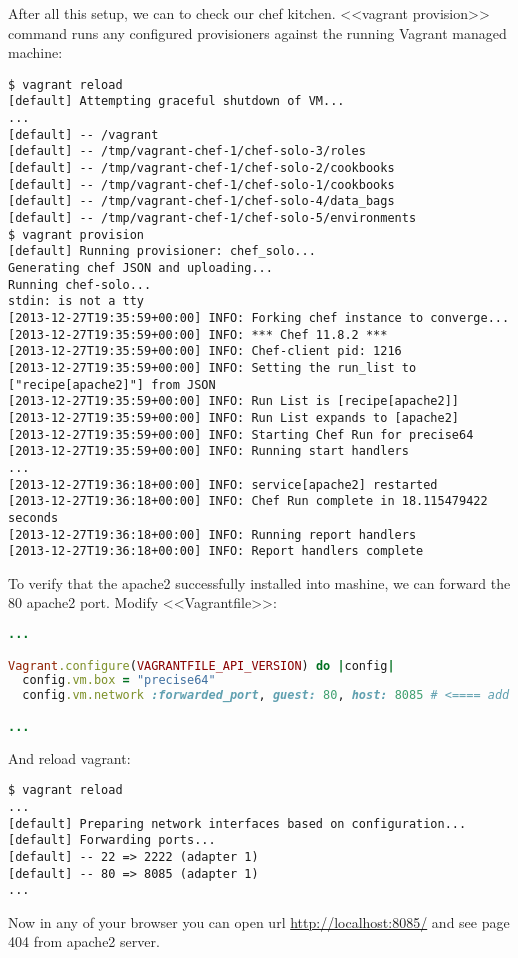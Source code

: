 After all this setup, we can to check our chef kitchen. <<vagrant provision>> command runs any configured provisioners against the running Vagrant managed machine:

\begin{lstlisting}[label=lst:my-cloud-vagrant8,title=my-cloud/nodes/Vagrantfile]
$ vagrant reload
[default] Attempting graceful shutdown of VM...
...
[default] -- /vagrant
[default] -- /tmp/vagrant-chef-1/chef-solo-3/roles
[default] -- /tmp/vagrant-chef-1/chef-solo-2/cookbooks
[default] -- /tmp/vagrant-chef-1/chef-solo-1/cookbooks
[default] -- /tmp/vagrant-chef-1/chef-solo-4/data_bags
[default] -- /tmp/vagrant-chef-1/chef-solo-5/environments
$ vagrant provision
[default] Running provisioner: chef_solo...
Generating chef JSON and uploading...
Running chef-solo...
stdin: is not a tty
[2013-12-27T19:35:59+00:00] INFO: Forking chef instance to converge...
[2013-12-27T19:35:59+00:00] INFO: *** Chef 11.8.2 ***
[2013-12-27T19:35:59+00:00] INFO: Chef-client pid: 1216
[2013-12-27T19:35:59+00:00] INFO: Setting the run_list to ["recipe[apache2]"] from JSON
[2013-12-27T19:35:59+00:00] INFO: Run List is [recipe[apache2]]
[2013-12-27T19:35:59+00:00] INFO: Run List expands to [apache2]
[2013-12-27T19:35:59+00:00] INFO: Starting Chef Run for precise64
[2013-12-27T19:35:59+00:00] INFO: Running start handlers
...
[2013-12-27T19:36:18+00:00] INFO: service[apache2] restarted
[2013-12-27T19:36:18+00:00] INFO: Chef Run complete in 18.115479422 seconds
[2013-12-27T19:36:18+00:00] INFO: Running report handlers
[2013-12-27T19:36:18+00:00] INFO: Report handlers complete
\end{lstlisting}

To verify that the apache2 successfully installed into mashine, we can forward the 80 apache2 port. Modify <<Vagrantfile>>:

\begin{lstlisting}[language=Ruby, label=lst:my-cloud-vagrant9,title=my-cloud/nodes/Vagrantfile]
...

Vagrant.configure(VAGRANTFILE_API_VERSION) do |config|
  config.vm.box = "precise64"
  config.vm.network :forwarded_port, guest: 80, host: 8085 # <==== add port forwarding

...
\end{lstlisting}

And reload vagrant:

\begin{lstlisting}[label=lst:my-cloud-vagrant10,title=my-cloud/nodes/Vagrantfile]
$ vagrant reload
...
[default] Preparing network interfaces based on configuration...
[default] Forwarding ports...
[default] -- 22 => 2222 (adapter 1)
[default] -- 80 => 8085 (adapter 1)
...
\end{lstlisting}

Now in any of your browser you can open url \href{http://localhost:8085/}{http://localhost:8085/} and see page 404 from apache2 server.